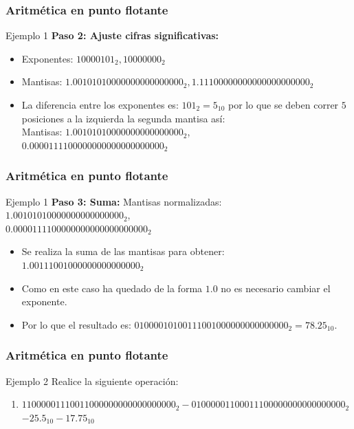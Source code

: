 \documentclass{beamer}
\begin{document}
\begin{frame}
	\frametitle{Aritmética en punto flotante}
	\begin{block}{Ejemplo 1}
	\textbf{Paso 2: Ajuste cifras significativas:}
		\begin{itemize}
			\item Exponentes: $10000101_{2}, 10000000_{2}$ 
			\item Mantisas: $1.00101010000000000000000_{2},1.11100000000000000000000_{2}$
			\item La diferencia entre los exponentes es: $101_{2} = 5_{10}$ por lo que se deben correr $5$ posiciones a la izquierda la segunda mantisa así:
			\\ Mantisas: $1.00101010000000000000000_{2}$,\\\textbf{$0.0000111100000000000000000000_{2}$}
		\end{itemize}		
	\end{block}
\end{frame}



\begin{frame}
	\frametitle{Aritmética en punto flotante}
	\begin{block}{Ejemplo 1}
	\textbf{Paso 3: Suma:}
		Mantisas normalizadas: \\ $1.00101010000000000000000_{2}$,\\\textbf{$0.0000111100000000000000000000_{2}$}
		\begin{itemize}
			\item Se realiza la suma de las mantisas para obtener:\\
			$1.00111001000000000000000_{2}$
			\item Como en este caso ha quedado de la forma $1.0$ no es necesario cambiar el exponente.
			\item Por lo que el resultado es: $0 10000101 00111001000000000000000_{2} = 78.25_{10}$.							
		\end{itemize}		
	\end{block}
\end{frame}



\begin{frame}
	\frametitle{Aritmética en punto flotante}
	\begin{block}{Ejemplo 2}
	Realice la siguiente operación:
	\begin{enumerate}
		\item $11000001110011000000000000000000_{2} - 01000001100011100000000000000000_{2}$
		\\ $-25.5_{10} - 17.75_{10}$
	\end{enumerate}	
	\end{block}
\end{frame}
\end{document}
